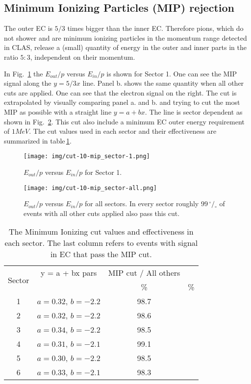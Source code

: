 \clearpage\newpage

\subsection{Minimum Ionizing Particles (MIP) rejection}
The outer EC is $5/3$ times bigger than the inner EC. Therefore pions,
which do not shower and are minimum ionizing particles in the momentum range 
detected in CLAS, release a (small) quantity of energy in the outer and inner
parts in the ratio $5:3$, independent on their momentum.

In Fig.~\ref{fig:EoEi} the $E_{out}/p$ versus $E_{in}/p$ is shown for Sector 1.
One can see the MIP signal along the $y=5/3x $ line.
Panel b. shows the same quantity when all other cuts are applied. 
One can see that the electron signal on the right.
The cut is extrapolated by visually comparing panel a. and b. and trying to
cut the most MIP as possible with a straight line $y = a + bx$. The line
is sector dependent as shown in Fig.~\ref{fig:EoEi_all}.
This cut also include a minimum EC outer energy requirement of $1MeV$.
The cut values used in each sector and their effectiveness are summarized in 
table\,\ref{tab:EoEi}.


\begin{figure}[ht]
  \centering
		\texttt{[image: img/cut-10-mip\_sector-1.png]}
		\caption{$E_{out}/p$ versus $E_{in}/p$ for Sector 1.}
 		\label{fig:EoEi}
\end{figure}


\clearpage\newpage
\begin{figure}[ht]
  \centering
		\texttt{[image: img/cut-10-mip\_sector-all.png]}
		\caption{$E_{out}/p$ versus $E_{in}/p$ for all sectors. In every sector
					roughly $99\,^{\circ\!\!}/\!_\circ$ of events with all other cuts applied also pass this cut. }
 		\label{fig:EoEi_all}
\end{figure}

\clearpage\newpage

\begin{table}[ht]
\label{tab:EoEi}
	\begin{center}
		\begin{tabular}{c | c | c | c}
			\hline 
			\multirow{2}{*}{Sector} 
					& y = a + bx pars & MIP cut / All others \\
					&   & \% & \% \\
			\hline
			1    & $a=0.32$, $b=-2.2$ & 98.7 \\
			2    & $a=0.32$, $b=-2.2$ & 98.6 \\
			3    & $a=0.34$, $b=-2.2$ & 98.5 \\
			4    & $a=0.31$, $b=-2.1$ &  99.1 \\
			5    & $a=0.30$, $b=-2.2$ &  98.5 \\
			6    & $a=0.33$, $b=-2.1$ &  98.3 \\
			\hline
		\end{tabular}
		\caption{The Minimum Ionizing cut values and effectiveness in each sector.
					The last column refers to events with signal in EC that pass the MIP cut.}	
	\end{center}
\end{table}



